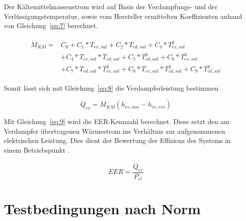 Der Kältemittelmassenstrom wird auf Basis der Verdampfungs- und der Verlüssigungstemperatur, sowie vom Hersteller ermittelten Koeffizienten anhand von Gleichung~\ref{eq:7} berechnet.

\begin{align}
\label{eq:7}
	\begin{split}
	\dot{M}_{KM} = &C_0 + C_1*T_{ev,sat} + C_2*T_{cd,sat} + C_3*T_{ev,sat}^2 \\
	&+C_4*T_{ev,sat}*T_{cd,sat} + C_5*T_{cd,sat}^2 + C_6*T_{ev,sat}^3 \\
	&+ C_7*T_{cd,sat}*T_{ev,sat}^2 +C_8*T_{ev,sat}*T_{cd,sat}^2 + C_9*T_{cd,sat}^3
	\end{split}
\end{align}

Somit lässt sich mit Gleichung~\ref{eq:8} die Verdampferleistung bestimmen.

\begin{equation}
\label{eq:8}
\dot{Q}_{ev}= \dot{M}_{KM}(h_{ev,aus} - h_{ev,ein})
\end{equation}

Mit Gleichung~\ref{eq:9} wird die EER-Kennzahl berechnet. Diese setzt den am Verdampfer übertragenen Wärmestrom ins Verhältnis zur aufgenommenen elektrischen Leistung. Dies dient der Bewertung der Effizienz des Systems in einem Betriebspunkt \cite{Muller.2016}.


\begin{equation}
\label{eq:9}
EER = \frac{\dot{Q}_{ev}}{P_{el}}
\end{equation}



\section{Testbedingungen nach Norm}
\label{sec:Testbedingungen nach Norm}

